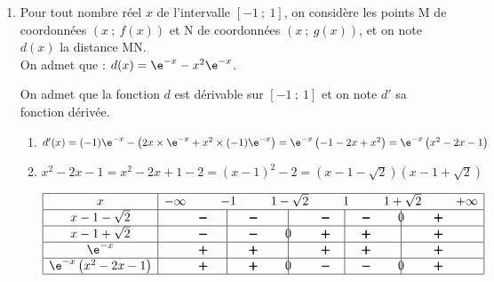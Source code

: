 \begin{enumerate}
\begin{enumerate}
	\end{enumerate}
\item  Pour tout nombre réel $x$ de l'intervalle $[-1~;~1]$, on considère les points M de coordonnées $(x~;~f(x))$ et N de coordonnées $(x~;~g(x))$, et on note $d(x)$ la distance MN. \\
On admet que : $d(x)= \e^{-x} - x^2\e^{-x}$.

On admet que la fonction $d$ est dérivable sur  $[-1~;~1]$ et on note $d'$ sa fonction dérivée.
	\begin{enumerate}
		\item 
$d'(x) = (-1) \e^{-x} - \left ( 2x \times \e^{-x} + x^2 \times (-1)\e^{-x}\right )
= \e^{-x} \left ( -1 -2x +x^2\right ) = \e^{-x} \left (x^2-2x-1\right )$
				
		\item
$x^2-2x-1 = x^2-2x+1-2 = (x-1)^2-2 = \left ( x-1-\sqrt{2}\right )\left (x-1+\sqrt{2}\right )$

\begin{center}
{
\renewcommand{\arraystretch}{1.5}
\def\esp{\hspace*{0cm}}
$\begin{array}{|c | *{11}{c} |} 
\hline
x  & -\infty & \esp & -1 & \esp & 1-\sqrt{2} & \esp & 1 & \esp & 1+\sqrt{2} & \esp & +\infty \\
\hline
x-1-\sqrt{2} &  & \pmb{-} & \vline\hspace{-2.7pt}{\phantom 0} & \pmb{-} &  \vline\hspace{-2.7pt}{\phantom 0} & \pmb{-} & \vline\hspace{-2.7pt}{\phantom 0} & \pmb{-} &  \vline\hspace{-2.7pt}{0} & \pmb{+} &\\
\hline
x-1+\sqrt{2} &  & \pmb{-} & \vline\hspace{-2.7pt}{\phantom 0} & \pmb{-} &  \vline\hspace{-2.7pt}{0} & \pmb{+} & \vline\hspace{-2.7pt}{\phantom 0} & \pmb{+} &  \vline\hspace{-2.7pt}{\phantom 0} & \pmb{+} &\\
\hline
\e^{-x} &  & \pmb{+} & \vline\hspace{-2.7pt}{\phantom 0} & \pmb{+} &  \vline\hspace{-2.7pt}{\phantom 0} & \pmb{+} & \vline\hspace{-2.7pt}{\phantom 0} & \pmb{+} &  \vline\hspace{-2.7pt}{\phantom 0} & \pmb{+} &\\
\hline
\e^{-x} \left (x^2-2x-1\right )&  & \pmb{+} & \vline\hspace{-2.7pt}{\phantom 0} & \pmb{+} &  \vline\hspace{-2.7pt}{0} & \pmb{-} & \vline\hspace{-2.7pt}{\phantom 0} & \pmb{-} &  \vline\hspace{-2.7pt}{0} & \pmb{+} &\\
\hline
\end{array}$
}
\end{center}


\end{enumerate}
\end{enumerate}
